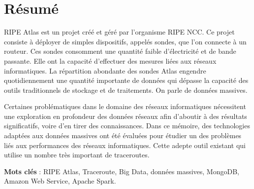 \chapter*{Résumé}


RIPE Atlas est un projet créé et géré par l'organisme RIPE NCC.  Ce projet consiste  à déployer de
simples dispositifs, appelés sondes, que l'on  connecte à un routeur. Ces sondes consomment une quantité
faible d'électricité et de bande passante. Elle ont la capacité d'effectuer des mesures liées aux réseaux informatiques.
La répartition abondante des sondes Atlas engendre quotidiennement une quantité importante
de données qui dépasse la capacité des outils traditionnels de stockage et de traitements. On parle de données massives. 

Certaines problématiques dans le domaine des réseaux
informatiques nécessitent une exploration en profondeur des données réseaux afin d'aboutir à des
résultats significatifs, voire d'en tirer des connaissances. Dans ce mémoire, des technologies adaptées aux données massives ont été évaluées pour étudier un des problèmes liés aux performances des réseaux informatiques. Cette adepte  outil existant qui utilise    un nombre très important de traceroutes. 







\textbf{Mots clés} : RIPE Atlas, Traceroute,  Big Data, données massives, MongoDB, Amazon Web Service, Apache Spark.